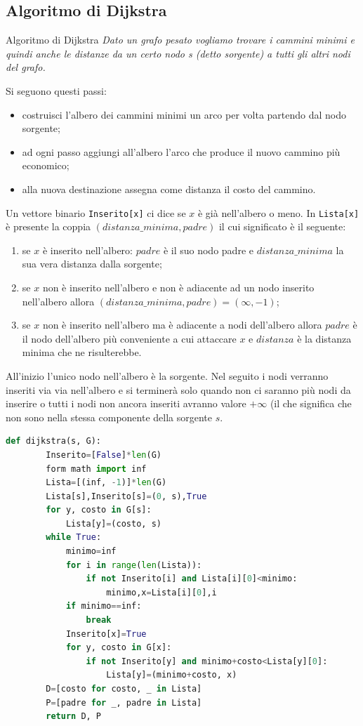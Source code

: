 \subsection{Algoritmo di Dijkstra}
\begin{Algoritmo}{Algoritmo di Dijkstra}{}
    \textit{Dato un grafo pesato vogliamo trovare i cammini minimi e quindi anche le distanze da un certo nodo s (detto sorgente) a tutti gli altri nodi del grafo.} 
    
    Si seguono questi passi:
    \begin{itemize}
        \item costruisci l'albero dei cammini minimi un arco per volta partendo dal nodo sorgente;
        \item ad ogni passo aggiungi all'albero l'arco che produce il nuovo cammino più economico;
        \item alla nuova destinazione assegna come distanza il costo del cammino.
    \end{itemize}

    Un vettore binario \verb|Inserito[x]| ci dice se $x$ è già nell'albero o meno. In \verb|Lista[x]| è presente la coppia $(distanza\_minima, padre)$ il cui significato è il seguente:
    \begin{enumerate}
        \item se $x$ è inserito nell'albero: $padre$ è il suo nodo padre e $distanza\_minima$ la sua vera distanza dalla sorgente;
        \item se $x$ non è inserito nell'albero e non è adiacente ad un nodo inserito nell'albero allora $(distanza\_minima, padre) = (\infty , -1)$;
        \item se $x$ non è inserito nell'albero ma è adiacente a nodi dell'albero allora $padre$ è il nodo dell'albero più conveniente a cui attaccare $x$ e $distanza$ è la distanza minima che ne risulterebbe.
    \end{enumerate}

    All'inizio l'unico nodo nell'albero è la sorgente. Nel seguito i nodi verranno inseriti via via nell'albero e si terminerà solo quando non ci saranno più nodi da inserire o tutti i nodi non ancora inseriti avranno valore $+\infty$ (il che significa che non sono nella stessa componente della sorgente $s$.

    \begin{lstlisting}[language=Python]
    def dijkstra(s, G):
        Inserito=[False]*len(G)
        form math import inf
        Lista=[(inf, -1)]*len(G)
        Lista[s],Inserito[s]=(0, s),True
        for y, costo in G[s]:
            Lista[y]=(costo, s)
        while True:
            minimo=inf
            for i in range(len(Lista)):
                if not Inserito[i] and Lista[i][0]<minimo:
                    minimo,x=Lista[i][0],i
            if minimo==inf:
                break
            Inserito[x]=True
            for y, costo in G[x]:
                if not Inserito[y] and minimo+costo<Lista[y][0]:
                    Lista[y]=(minimo+costo, x)
        D=[costo for costo, _ in Lista]
        P=[padre for _, padre in Lista]
        return D, P
    \end{lstlisting}


\end{Algoritmo}
